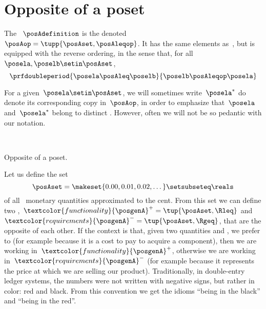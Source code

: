 
\section{Opposite of a poset}\label{sec:opposite-of-a-poset}

\begin{ctdefinition}
    \label{def:poset-opposite}
    The ~$\posAdefinition$ is the  denoted~$\posAop=\tupp{\posAset, \posAleqop}$.
    It has the same elements as~\posA, but is equipped with the reverse ordering, in the sense that, for all~$\posela,\poselb \setin \posAset$,
    \begin{equation}\label{eq:poset-opposite}
        \prfdoubleperiod{
            \posela \posAleq \poselb
        }{
            \poselb \posAleqop \posela
        }
    \end{equation}
\end{ctdefinition}
For a given~$\posela \setin \posAset$, we will sometimes write~$\posela^*$ do denote its corresponding copy in~$\posAop$, in order to emphasize that~$\posela$ and~$\posela^*$ belong to distinct .
However, often we will not be so pedantic with our notation.

\begin{marginfigure}
    \centering
    \\
    \caption{
        Opposite of a poset.
    }
    \label{fig:poset-opposite}
\end{marginfigure}

\begin{example}
    Let us define the set
    \begin{equation}\label{eq:credit-debit}
        \posAset=\makeset{0.00,0.01,0.02,\dots}\setsubseteq\reals
    \end{equation}
    of all \CHFneutral \ monetary quantities approximated to the cent.
    From this set we can define two ,~$\textcolor{functionality}{\posgenA}^{+} = \tup{\posAset, {{\Rleq}}}$ and~$\textcolor{requirements}{\posgenA}^{-} = \tup{\posAset,{{ \Rgeq}}}$, that are the opposite of each other.
    If the context is that, given two quantities \unit[1]{\CHFneutral} and \unit[2]{\CHFneutral}, we prefer \unit[1]{\CHFneutral} to \unit[2]{\CHFneutral} (for example because it is a cost to pay to acquire a component), then we are working in~$\textcolor{functionality}{\posgenA}^{+}$, otherwise we are working in~$\textcolor{requirements}{\posgenA}^{-}$ (for example because it represents the price at which we are selling our product).
    Traditionally, in double-entry ledger systems, the numbers were not written with negative signs, but rather in color: red and black.
    From this convention we get the idioms ``being in the black'' and ``being in the red''.
\end{example}
